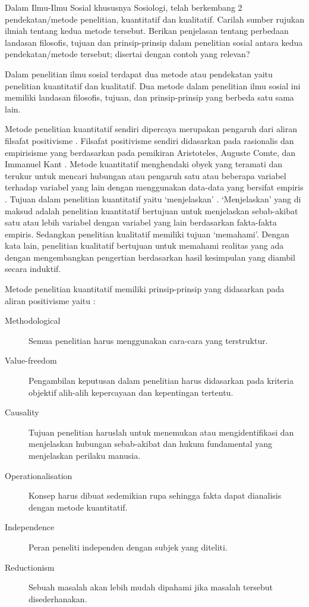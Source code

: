	\question
Dalam Ilmu-Ilmu Sosial khususnya Sosiologi, telah berkembang 2 pendekatan/metode penelitian, kuantitatif dan kualitatif. Carilah sumber rujukan ilmiah tentang kedua metode tersebut.
Berikan penjelasan tentang perbedaan landasan filosofis, tujuan dan prinsip-prinsip dalam penelitian sosial antara kedua pendekatan/metode tersebut; disertai dengan contoh yang relevan?
\begin{solution}
	Dalam penelitian ilmu sosial terdapat dua metode atau pendekatan yaitu penelitian kuantitatif dan kualitatif.
	Dua metode dalam penelitian ilmu sosial ini memiliki landasan filosofis, tujuan, dan prinsip-prinsip yang berbeda satu sama lain.
	
	Metode penelitian kuantitatif sendiri dipercaya merupakan pengaruh dari aliran filsafat positivisme \cite{ginting_filsafat_2008,mertens_research_2015,kothari_research_2013}.
	Filsafat positivisme sendiri didasarkan pada rasionalis dan empirisisme yang berdasarkan pada pemikiran Aristoteles, Auguste Comte, dan Immanuel Kant \cite{mertens_research_2015}.
	Metode kuantitatif menghendaki obyek yang teramati dan terukur untuk mencari hubungan atau pengaruh satu atau beberapa variabel terhadap variabel yang lain dengan menggunakan data-data yang bersifat empiris \cite{ginting_filsafat_2008}.
	Tujuan dalam penelitian kuantitatif yaitu `menjelaskan' \cite{ginting_filsafat_2008}.
	`Menjelaskan' yang di maksud adalah penelitian kuantitatif bertujuan untuk menjelaskan sebab-akibat satu atau lebih variabel dengan variabel yang lain berdasarkan fakta-fakta empiris. Sedangkan penelitian kualitatif memiliki tujuan `memahami'. Dengan kata lain, penelitian kualitatif bertujuan untuk memahami realitas yang ada dengan mengembangkan pengertian berdasarkan hasil kesimpulan yang diambil secara induktif.
	
	Metode penelitian kuantitatif memiliki prinsip-prinsip yang didasarkan pada aliran positivisme yaitu \cite{crossan_research_2003}:
	\begin{description}
		\item[Methodological] Semua penelitian harus menggunakan cara-cara yang terstruktur.
		\item[Value-freedom] Pengambilan keputusan dalam penelitian harus didasarkan pada kriteria objektif alih-alih kepercayaan dan kepentingan tertentu.
		\item[Causality] Tujuan penelitian haruslah untuk menemukan atau mengidentifikasi dan menjelaskan hubungan sebab-akibat dan hukum fundamental yang menjelaskan perilaku manusia.
		\item[Operationalisation] Konsep harus dibuat sedemikian rupa sehingga fakta dapat dianalisis dengan metode kuantitatif.
		\item[Independence] Peran peneliti independen dengan subjek yang diteliti.
		\item[Reductionism] Sebuah masalah akan lebih mudah dipahami jika masalah tersebut disederhanakan.
	\end{description}
	

\end{solution}
